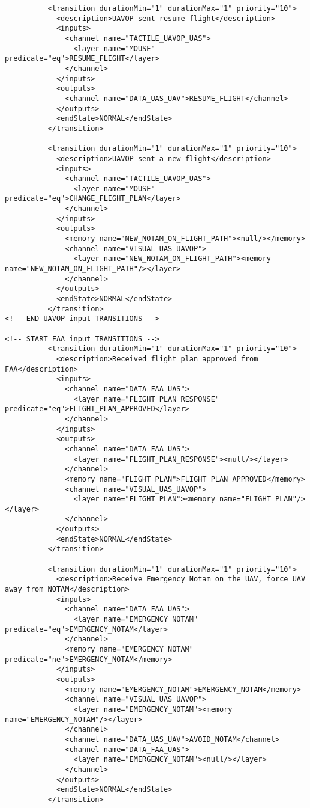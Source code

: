 \begin{verbatim}
          <transition durationMin="1" durationMax="1" priority="10">
            <description>UAVOP sent resume flight</description>
            <inputs>
              <channel name="TACTILE_UAVOP_UAS">
                <layer name="MOUSE" predicate="eq">RESUME_FLIGHT</layer>
              </channel>
            </inputs>
            <outputs>
              <channel name="DATA_UAS_UAV">RESUME_FLIGHT</channel>
            </outputs>
            <endState>NORMAL</endState>
          </transition>
          
          <transition durationMin="1" durationMax="1" priority="10">
            <description>UAVOP sent a new flight</description>
            <inputs>
              <channel name="TACTILE_UAVOP_UAS">
                <layer name="MOUSE" predicate="eq">CHANGE_FLIGHT_PLAN</layer>
              </channel>
            </inputs>
            <outputs>
              <memory name="NEW_NOTAM_ON_FLIGHT_PATH"><null/></memory>
              <channel name="VISUAL_UAS_UAVOP">
                <layer name="NEW_NOTAM_ON_FLIGHT_PATH"><memory name="NEW_NOTAM_ON_FLIGHT_PATH"/></layer>
              </channel>
            </outputs>
            <endState>NORMAL</endState>
          </transition>
<!-- END UAVOP input TRANSITIONS -->
          
<!-- START FAA input TRANSITIONS -->
          <transition durationMin="1" durationMax="1" priority="10">
            <description>Received flight plan approved from FAA</description>
            <inputs>
              <channel name="DATA_FAA_UAS">
                <layer name="FLIGHT_PLAN_RESPONSE" predicate="eq">FLIGHT_PLAN_APPROVED</layer>
              </channel>
            </inputs>
            <outputs>
              <channel name="DATA_FAA_UAS">
                <layer name="FLIGHT_PLAN_RESPONSE"><null/></layer>
              </channel>
              <memory name="FLIGHT_PLAN">FLIGHT_PLAN_APPROVED</memory>
              <channel name="VISUAL_UAS_UAVOP">
                <layer name="FLIGHT_PLAN"><memory name="FLIGHT_PLAN"/></layer>
              </channel>
            </outputs>
            <endState>NORMAL</endState>
          </transition>
          
          <transition durationMin="1" durationMax="1" priority="10">
            <description>Receive Emergency Notam on the UAV, force UAV away from NOTAM</description>
            <inputs>
              <channel name="DATA_FAA_UAS">
                <layer name="EMERGENCY_NOTAM" predicate="eq">EMERGENCY_NOTAM</layer>
              </channel>
              <memory name="EMERGENCY_NOTAM" predicate="ne">EMERGENCY_NOTAM</memory>
            </inputs>
            <outputs>
              <memory name="EMERGENCY_NOTAM">EMERGENCY_NOTAM</memory>
              <channel name="VISUAL_UAS_UAVOP">
                <layer name="EMERGENCY_NOTAM"><memory name="EMERGENCY_NOTAM"/></layer>
              </channel>
              <channel name="DATA_UAS_UAV">AVOID_NOTAM</channel>
              <channel name="DATA_FAA_UAS">
                <layer name="EMERGENCY_NOTAM"><null/></layer>
              </channel>
            </outputs>
            <endState>NORMAL</endState>
          </transition>
          

\end{verbatim}
